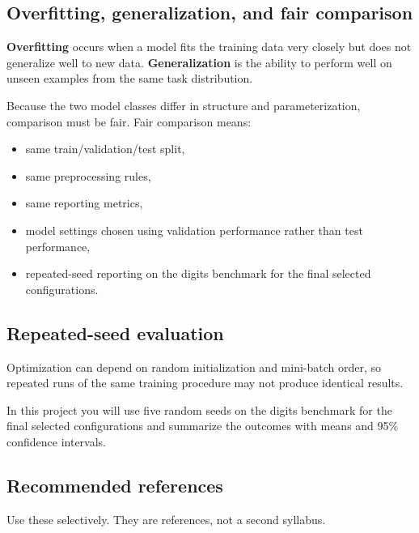 \documentclass[11pt]{article}
\begin{document}
\subsection{Overfitting, generalization, and fair comparison}

\textbf{Overfitting} occurs when a model fits the training data very closely but does not generalize well to new data. \textbf{Generalization} is the ability to perform well on unseen examples from the same task distribution.

Because the two model classes differ in structure and parameterization, comparison must be fair. Fair comparison means:

\begin{itemize}
    \item same train/validation/test split,
    \item same preprocessing rules,
    \item same reporting metrics,
    \item model settings chosen using validation performance rather than test performance,
    \item repeated-seed reporting on the digits benchmark for the final selected configurations.
\end{itemize}

\subsection{Repeated-seed evaluation}

Optimization can depend on random initialization and mini-batch order, so repeated runs of the same training procedure may not produce identical results.

In this project you will use five random seeds on the digits benchmark for the final selected configurations and summarize the outcomes with means and 95\% confidence intervals.

\subsection{Recommended references}

Use these selectively. They are references, not a second syllabus.
\end{document}
